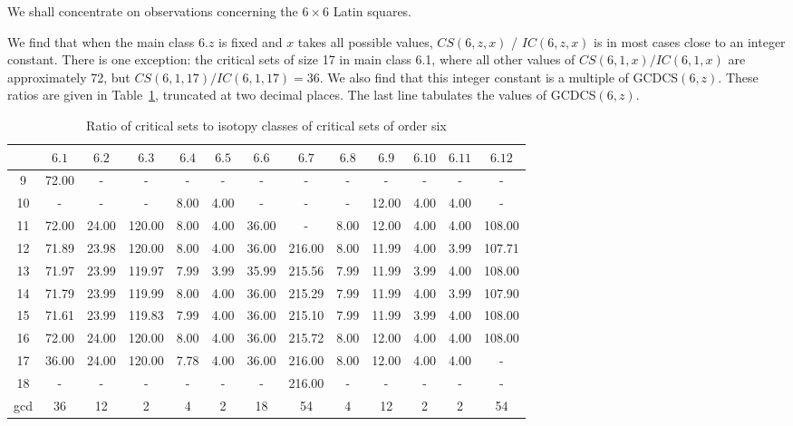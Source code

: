 \documentclass[12pt]{report}
\begin{document}
We shall concentrate on observations concerning the $6 \times 6$ Latin squares.

We find that when the main class $6.z$ is fixed and $x$ takes all possible
values, \break $CS(6,z,x)$ / $IC(6,z,x)$ is in most cases close to an integer
constant.  There is one exception: the critical sets of size 17 in main
class 6.1, where all other values of $CS(6,1,x) / IC(6,1,x)$ are approximately 72,
but $CS(6,1,17) / IC(6,1,17) = 36$.  We also find that this integer constant is a
multiple of GCDCS$(6,z)$.  These ratios are given in Table~\ref{seven},
truncated at two decimal places.  The last line tabulates the values
of GCDCS$(6,z)$.
\begin{table}
\begin{center}
\begin{footnotesize}
\caption{Ratio of critical sets to isotopy classes of critical sets of order six}
\label{seven}
\begin{tabular}{|c|c|c|c|c|c|c|c|c|c|c|c|c|} \hline
& $6.1$ & $6.2$ & $6.3$ & $6.4$ & $6.5$ & $6.6$ & $6.7$ & $6.8$ & $6.9$ & $6.10$ & $6.11$ & $6.12$ \\
\hline
9 &  72.00 &   -   &    -   &  -   &  -   &   -   &    -   &  -   & -     &  -   &  -   &  - \\
10 &   -   &   -   &    -   & 8.00 & 4.00 &   -   &    -   &  -   & 12.00 & 4.00 & 4.00 &  - \\
11 & 72.00 & 24.00 & 120.00 & 8.00 & 4.00 & 36.00 &    -   & 8.00 & 12.00 & 4.00 & 4.00 & 108.00  \\
12 & 71.89 & 23.98 & 120.00 & 8.00 & 4.00 & 36.00 & 216.00 & 8.00 & 11.99 & 4.00 & 3.99 & 107.71 \\
13 & 71.97 & 23.99 & 119.97 & 7.99 & 3.99 & 35.99 & 215.56 & 7.99 & 11.99 & 3.99 & 4.00 & 108.00 \\
14 & 71.79 & 23.99 & 119.99 & 8.00 & 4.00 & 36.00 & 215.29 & 7.99 & 11.99 & 4.00 & 3.99 & 107.90 \\
15 & 71.61 & 23.99 & 119.83 & 7.99 & 4.00 & 36.00 & 215.10 & 7.99 & 11.99 & 3.99 & 4.00 & 108.00 \\
16 & 72.00 & 24.00 & 120.00 & 8.00 & 4.00 & 36.00 & 215.72 & 8.00 & 12.00 & 4.00 & 4.00 & 108.00 \\
17 & 36.00 & 24.00 & 120.00 & 7.78 & 4.00 & 36.00 & 216.00 & 8.00 & 12.00 & 4.00 & 4.00 &    - \\
18 &   -   &   -   &    -   &  -   &  -   &   -   & 216.00 &  -   &   -   &  -   &  -   &    -  \\
\hline
gcd & 36 & 12 & 2 & 4 & 2 & 18 & 54 & 4 & 12 & 2 & 2 & 54  \\
\hline
\end{tabular}\vspace {3mm} \\
\end{footnotesize}
\end{center}
\end{table}
\end{document}
